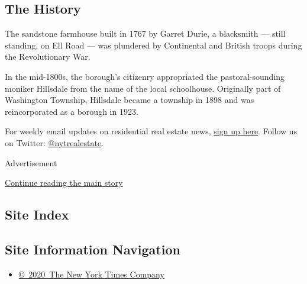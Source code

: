 \hypertarget{the-history}{%
\subsection{The History}\label{the-history}}

The sandstone farmhouse built in 1767 by Garret Durie, a blacksmith ---
still standing, on Ell Road --- was plundered by Continental and British
troops during the Revolutionary War.

In the mid-1800s, the borough's citizenry appropriated the
pastoral-sounding moniker Hillsdale from the name of the local
schoolhouse. Originally part of Washington Township, Hillsdale became a
township in 1898 and was reincorporated as a borough in 1923.

For weekly email updates on residential real estate news,
\href{http://www.nytimes.com/newsletters/realestate/}{sign up here}.
Follow us on Twitter:
\href{https://twitter.com/nytrealestate}{@nytrealestate}.

Advertisement

\protect\hyperlink{after-bottom}{Continue reading the main story}

\hypertarget{site-index}{%
\subsection{Site Index}\label{site-index}}

\hypertarget{site-information-navigation}{%
\subsection{Site Information
Navigation}\label{site-information-navigation}}

\begin{itemize}
\tightlist
\item
  \href{https://help.nytimes.com/hc/en-us/articles/115014792127-Copyright-notice}{©~2020~The
  New York Times Company}
\end{itemize}

